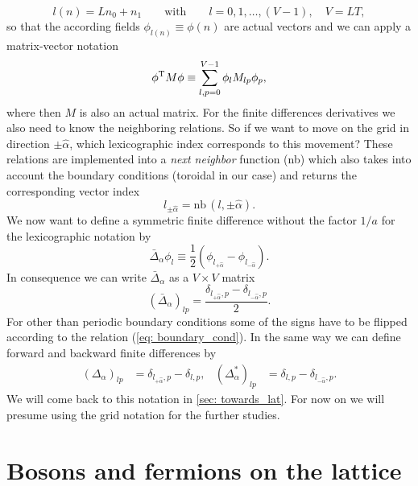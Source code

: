 %
%
\begin{equation}
l (n)= Ln_{0} + n_{1} \qquad \text{with} \qquad  l=0,1,\ldots,(V-1),\quad V=LT,
\end{equation}
%
%
so that the according fields $\phi_{l(n)}\equiv \phi(n)$ are actual vectors and we can apply a matrix-vector notation 
%
%
\begin{equation}
\phi^{\rm T}M\phi \equiv \sum\limits_{l,p=0}^{V-1} \phi_{l}M_{lp}\phi_{p},
\label{eq: lexi_mat_vec}
\end{equation}
%
%
where then $M$ is also an actual matrix. For the finite differences derivatives we also need  to know the neighboring relations. So if we want to move on the grid in direction $\pm \hat{\alpha}$, which lexicographic index corresponds to this movement? These relations are implemented into a \textit{next neighbor} function (nb) which also takes into account the boundary conditions (toroidal in our case) and returns the corresponding vector index
%
%
\begin{equation}
l_{\pm\hat{\alpha}} = \text{nb}\,(l,\pm\hat{\alpha}).
\end{equation}
%
%
We now want to define a symmetric finite difference without the factor $1/a$ for the lexicographic notation by
%
%
\begin{equation}
\bar{\Delta}_{\alpha} \phi_{l} \equiv \frac{1}{2}\left(\phi_{l_{+\hat{\alpha}}}-\phi_{l_{-\hat{\alpha}}}\right).
\end{equation}
%
%
In consequence we can write $\bar{\Delta}_{\alpha}$ as a $V\times V$ matrix
%
%
\begin{equation}
\left(\bar{\Delta}_{\alpha}\right)_{lp} = \frac{\delta_{l_{+\hat{\alpha}},p} - \delta_{l_{-\hat{\alpha}},p}}{2}.
\end{equation}
%
%
For other than periodic boundary conditions some of the signs have to be flipped according to the relation (\ref{eq: boundary_cond}).
In the same way we can define forward and backward finite differences by
%
%
\begin{align}
\left(\Delta_{\alpha}\right)_{lp} &= \delta_{l_{+\hat{\alpha}},p}-\delta_{l,p},  &
\left(\Delta^{*}_{\alpha}\right)_{lp} &= \delta_{l,p}-\delta_{l_{-\hat{\alpha}},p}.
\end{align}
We will come back to this notation in \autoref{sec: towards_lat}. For now on we will presume using the grid notation for the further studies.
%
%
%
%
%
%
%
%
%
%
%
%
\section{Bosons and fermions on the lattice}

